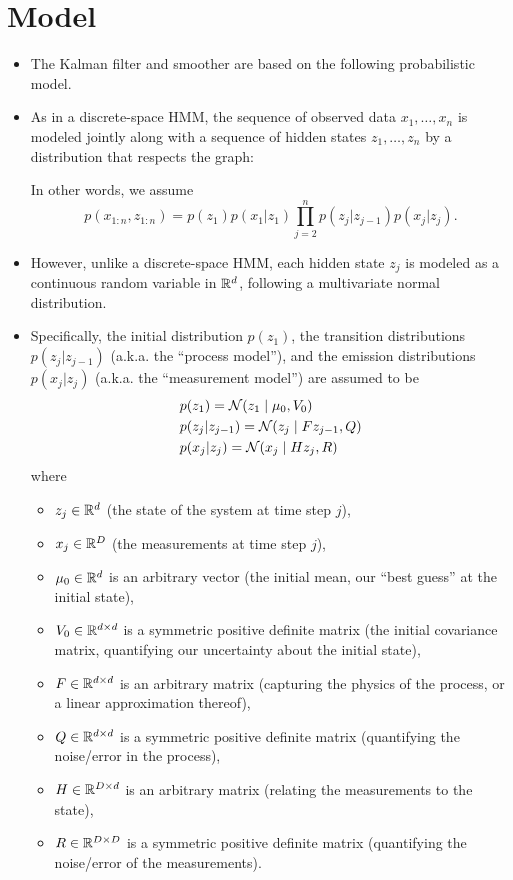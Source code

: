 \documentclass[12pt]{article}
\begin{document}
\section{Model}

\begin{itemize}
\item The Kalman filter and smoother are based on the following probabilistic model.
\item As in a discrete-space HMM, the sequence of observed data $x_1,\ldots,x_n$ is modeled jointly along with a sequence of hidden states $z_1,\ldots,z_n$ by a distribution that respects the graph:

In other words, we assume
$$ p(x_{1:n},z_{1:n}) = p(z_1) p(x_1 | z_1) \prod_{j = 2}^n p(z_j | z_{j -1}) p(x_j | z_j). $$
\item However, unlike a discrete-space HMM, each hidden state $z_j$ is modeled as a continuous random variable in $\mathbb{R}^d$, following a multivariate normal distribution. 
\item Specifically, the initial distribution $p(z_1)$, the transition distributions $p(z_j | z_{j-1})$ (a.k.a. the ``process model''), and the emission distributions $p(x_j | z_j)$ (a.k.a. the ``measurement model'') are assumed to be
\begin{align*}
& p(z_1) = \mathcal{N}(z_1 \mid \mu_0,V_0)\\
& p(z_j | z_{j-1}) = \mathcal{N}(z_j \mid F z_{j-1},Q)\\
& p(x_j | z_j) = \mathcal{N}(x_j \mid H z_j,R)
\end{align*}
where
\begin{itemize}
\item $z_j \in \mathbb{R}^d$ (the state of the system at time step $j$),
\item $x_j \in \mathbb{R}^D$ (the measurements at time step $j$),
\item $\mu_0 \in \mathbb{R}^d$ is an arbitrary vector (the initial mean, our ``best guess'' at the initial state),
\item $V_0 \in \mathbb{R}^{d \times d}$ is a symmetric positive definite matrix (the initial covariance matrix, quantifying our uncertainty about the initial state),
\item $F \in \mathbb{R}^{d \times d}$ is an arbitrary matrix (capturing the physics of the process, or a linear approximation thereof),
\item $Q \in \mathbb{R}^{d \times d}$ is a symmetric positive definite matrix (quantifying the noise/error in the process),
\item $H \in \mathbb{R}^{D \times d}$ is an arbitrary matrix (relating the measurements to the state),
\item $R \in \mathbb{R}^{D \times D}$ is a symmetric positive definite matrix (quantifying the noise/error of the measurements).
\end{itemize}
\end{itemize}
\end{document}
